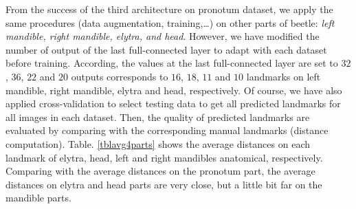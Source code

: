 \documentclass[review]{elsarticle}
\begin{document}
From the success of the third architecture on pronotum dataset, we apply the same procedures (data augmentation, training,\ldots) on other parts of beetle: \textit{left mandible, right mandible, elytra, and head}. However, we have modified the number of output of the last full-connected layer to adapt with each dataset before training. According, the values at the last full-connected layer are set to $32$, $36$, $22$ and $20$ outputs corresponds to $16$, $18$, $11$ and $10$ landmarks on left mandible, right mandible, elytra and head, respectively. Of course, we have also applied cross-validation to select testing data to get all predicted landmarks for all images in each dataset. Then, the quality of predicted landmarks are evaluated by comparing with the corresponding manual landmarks (distance computation). Table. \ref{tblavg4parts} shows the average distances on each landmark of elytra, head, left and right mandibles anatomical, respectively. Comparing with the average distances on the pronotum part, the average distances on elytra and head parts are very close, but a little bit far on the mandible parts.
\end{document}
